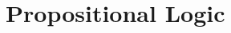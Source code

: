 \documentclass[nobib]{tufte-book}
\begin{document}
\part{Propositional Logic}\label{part:prop_logic}



%

%
%
%
%
%

%
%
%
%
%

%
%
%
%
%
%
%
%
%

%
%
%
%
%

%
%
%
%

%
%
%
%
%
\end{document}
